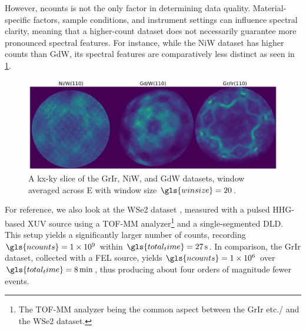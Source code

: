 However, \gls{ncounts} is not the only factor in determining data quality. Material-specific factors, sample conditions, and instrument settings can influence spectral clarity, meaning that a higher-count dataset does not necessarily guarantee more pronounced spectral features. For instance, while the \gls{NiW} dataset has higher counts  than \gls{GdW}, its spectral features are comparatively less distinct as seen in \cref{fig:all-hextof-datasets-kxky}.

\begin{figure}[h]
    \centering
    \includegraphics[width=1\linewidth]{images/datasets_3_kx_ky.pdf}
    \caption{A \gls{kx}-\gls{ky} slice of the \gls{GrIr}, \gls{NiW}, and \gls{GdW} datasets, window averaged across \gls{E} with window size $\gls{winsize}=\num{20}$.}
    \label{fig:all-hextof-datasets-kxky}
\end{figure}

For reference, we also look at the \gls{WSe2} dataset \cite{maklarTimeresolvedARPESRAW2022}, measured with a pulsed \gls{HHG}-based \gls{XUV} source using a \gls{TOF}-\gls{MM} analyzer\footnote{The \gls{TOF}-\gls{MM} analyzer being the common aspect between the \gls{GrIr} etc./ and the \gls{WSe2} dataset.} and a single-segmented \gls{DLD}. This setup yields a significantly larger number of counts, recording $\gls{ncounts}=\num{1e9}$ within $\gls{total_time}=\qty{27}{s}$. In comparison, the \gls{GrIr} dataset, collected with a \gls{FEL} source, yields $\gls{ncounts} = \num{1e6}$ over $\gls{total_time} = \qty{8}{\min}$, thus producing about four orders of magnitude fewer events.

